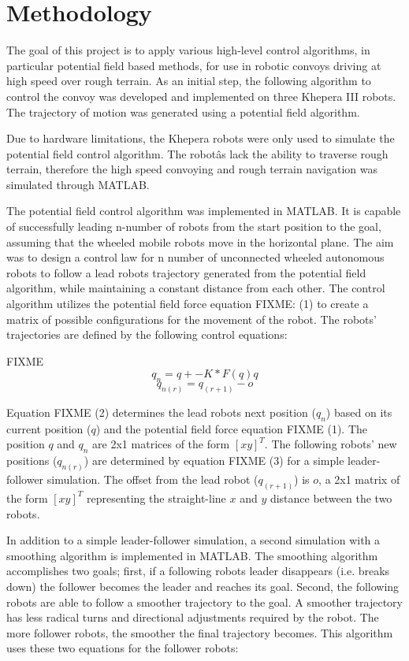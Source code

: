 \section{Methodology}
The goal of this project is to apply various high-level control algorithms, in particular potential field based methods, for use in robotic convoys driving at high speed over rough terrain. As an initial step, the following algorithm to control the convoy was developed and implemented on three Khepera III robots. The trajectory of motion was generated using a potential field algorithm.

Due to hardware limitations, the Khepera robots were only used to simulate the potential field control algorithm. The robotâs lack the ability to traverse rough terrain, therefore the high speed convoying and rough terrain navigation was simulated through MATLAB.

The potential field control algorithm was implemented in MATLAB. It is capable of successfully leading n-number of robots from the start position to the goal, assuming that the wheeled mobile robots move in the horizontal plane. The aim was to design a control law for n number of unconnected wheeled autonomous robots to follow a lead robots trajectory generated from the potential field algorithm, while maintaining a constant distance from each other. The control algorithm utilizes the potential field force equation FIXME: (1) to create a matrix of possible configurations for the movement of the robot. The robots' trajectories are defined by the following control equations:

FIXME
$$q_n=q+-K*F(q)q$$
$$q_{n(r)}=q_{(r+1)}-o$$

Equation FIXME (2) determines the lead robots next position ($q_n$) based on its current position ($q$) and the potential field force equation FIXME (1). The position $q$ and $q_n$ are 2x1 matrices of the form $[x y]^T$. The following robots' new positions ($q_{n(r)}$) are determined by equation FIXME (3) for a simple leader-follower simulation. The offset from the lead robot ($q_{(r+1)}$) is $o$, a 2x1 matrix of the form $[x y]^T$ representing the straight-line $x$ and $y$ distance between the two robots.

In addition to a simple leader-follower simulation, a second simulation with a smoothing algorithm is implemented in MATLAB. The smoothing algorithm accomplishes two goals; first, if a following robots leader disappears (i.e. breaks down) the follower becomes the leader and reaches its goal. Second, the following robots are able to follow a smoother trajectory to the goal. A smoother trajectory has less radical turns and directional adjustments required by the robot. The more follower robots, the smoother the final trajectory becomes. This algorithm uses these two equations for the follower robots:
